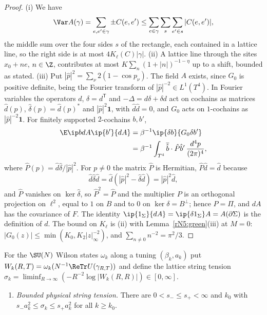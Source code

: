 \begin{proof}
(i) We have
\[
\Var A(\gamma)=\sum_{e,e'\in\gamma}\pm C(e,e')\le\sum_{e\in\gamma}\sum_{s}
\sum_{e'\in s}|C(e,e')|,
\]
the middle sum over the four sides $s$ of the rectangle, each contained in a lattice line, so the right side is at most
$4K_\ell(C)|\gamma|$. (ii) A lattice line through the sites $x_0+ne$, $n\in\Z$,
contributes at most $K\sum_n(1+|n|)^{-1-\eta}$ up to a shift, bounded as
stated. (iii) Put $|\hat p|^2=\sum_\nu2(1-\cos p_\nu)$. The field $A$
exists, since $G_0$ is positive definite, being the Fourier transform of
$|\hat p|^{-2}\in L^1(T^4)$. In Fourier variables the operators $d$,
$\delta=d^{\mathsf T}$ and $-\Delta=d\delta+\delta d$ act on cochains as
matrices $\hat d(p)$, $\hat\delta(p)=\hat d(p)^*$ and $|\hat p|^2\mathbf 1$,
with $\hat d\hat d=0$, and $G_0$ acts on $1$-cochains as $|\hat p|^{-2}\mathbf
1$. For finitely supported $2$-cochains $b,b'$,
\[
\begin{split}
\E\ip b{dA}\ip{b'}{dA}&=\beta^{-1}\ip{\delta b}{G_0\delta b'}\\
&=\beta^{-1}\int_{T^4}\overline{\hat b}\cdot\hat P\hat b'\,
\frac{d^4p}{(2\pi)^4},
\end{split}
\]
where $\hat P(p)=\hat d\hat\delta/|\hat p|^2$. For $p\ne0$ the matrix $\hat
P$ is Hermitian, $\hat P\hat d=\hat d$ because
\[
\hat d\hat\delta\hat d=\hat d(|\hat p|^2-\hat\delta\hat d)=|\hat p|^2\hat d,
\]
and $\hat P$ vanishes on $\ker\hat\delta$, so $\hat P^2=\hat P$ and
the multiplier $P$ is an orthogonal projection on $\ell^2$, equal to $1$ on
$B$ and to $0$ on $\ker\delta=B^\perp$; hence $P=\Pi$, and $dA$ has the
covariance of $F$. The identity $\ip{1_\Sigma}{dA}=\ip{\delta1_\Sigma}A=
A(\partial\Sigma)$ is the definition of $d$. The bound on $K_\ell$ is (ii)
with Lemma~\ref{rN5:green}(iii) at $M=0$: $|G_0(z)|\le\min(K_0,K_2
|z|_\infty^{-2})$, and $\sum_{n\ne0}n^{-2}=\pi^2/3$.
\end{proof}

For the $\SU(N)$ Wilson states $\omega_k$ along a tuning $(\beta_k,a_k)$ put
$W_k(R,T)=\omega_k(N^{-1}\ReTr U(\gamma_{R,T}))$ and define the lattice string
tension $\sigma_k=\liminf_{R\to\infty}(-R^{-2}\log|W_k(R,R)|)\in[0,\infty]$.
\begin{enumerate}[label=\textup{(ST)},leftmargin=*]
\item \emph{Bounded physical string tension.} There are $0<s_-\le s_+<\infty$
and $k_0$ with $s_-a_k^2\le\sigma_k\le s_+a_k^2$ for all $k\ge k_0$.
\end{enumerate}

